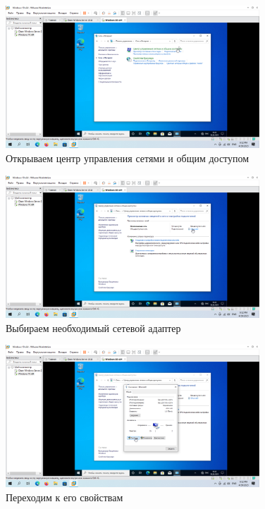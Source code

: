\documentclass[a4paper]{article}
\begin{document}
  \begin{figure}[H]
    \centering
    \includegraphics[width=0.85\textwidth]{Screenshot_84}
    \caption{Открываем центр управления сетями и общим доступом}
    \label{img:84}
  \end{figure}

  \begin{figure}[H]
    \centering
    \includegraphics[width=0.85\textwidth]{Screenshot_86}
    \caption{Выбираем необходимый сетевой адаптер}
    \label{img:86}
  \end{figure}

  \begin{figure}[H]
    \centering
    \includegraphics[width=0.85\textwidth]{Screenshot_87}
    \caption{Переходим к его свойствам}
    \label{img:87}
  \end{figure}
\end{document}
